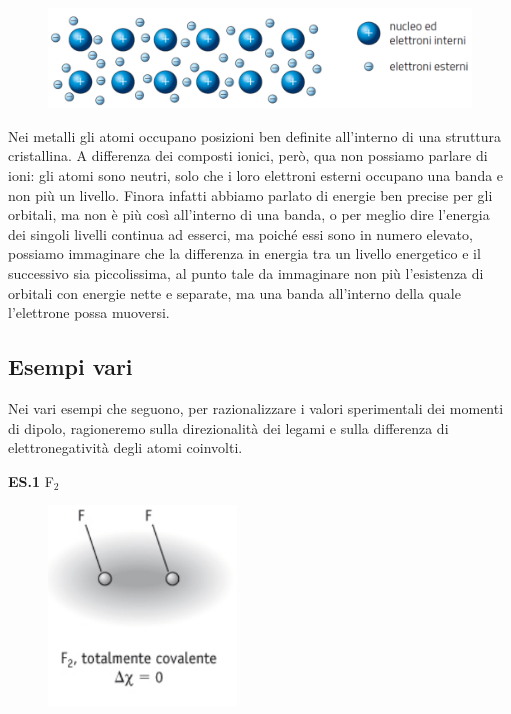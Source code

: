 \begin{figure}[htp]
    \centering
    \includegraphics[width=14cm]{immagini/legame-metallico.png}
\end{figure}

Nei metalli gli atomi occupano posizioni ben definite all'interno di una struttura cristallina. A differenza dei composti ionici, però, qua non possiamo parlare di ioni: gli atomi sono neutri, solo che i loro elettroni esterni occupano una banda e non più un livello. Finora infatti abbiamo parlato di energie ben precise per gli orbitali, ma non è più così all'interno di una banda, o per meglio dire l'energia dei singoli livelli continua ad esserci, ma poiché essi sono in numero elevato, possiamo immaginare che la differenza in energia tra un livello energetico e il successivo sia piccolissima, al punto tale da immaginare non più l'esistenza di orbitali con energie nette e separate, ma una banda all'interno della quale l'elettrone possa muoversi.

\subsection{Esempi vari}
Nei vari esempi che seguono, per razionalizzare i valori sperimentali dei momenti di dipolo, ragioneremo sulla direzionalità dei legami e sulla differenza di elettronegatività degli atomi coinvolti.

\vspace{0.2cm}\textbf{ES.1} F$_2$

\vspace{-0.3cm}\begin{figure}[H]
    \centering
    \includegraphics[width=5cm]{immagini/F_2.png}
\end{figure}

